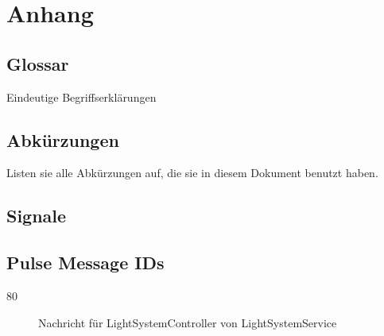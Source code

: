 \chapter{Anhang}

\section{Glossar}

Eindeutige Begriffserklärungen

\section{Abkürzungen}

Listen sie alle Abkürzungen auf, die sie in diesem Dokument benutzt
haben.

\section{Signale}

\section{Pulse Message IDs}

\begin{description}
    \item[80] Nachricht für LightSystemController von LightSystemService
\end{description}
